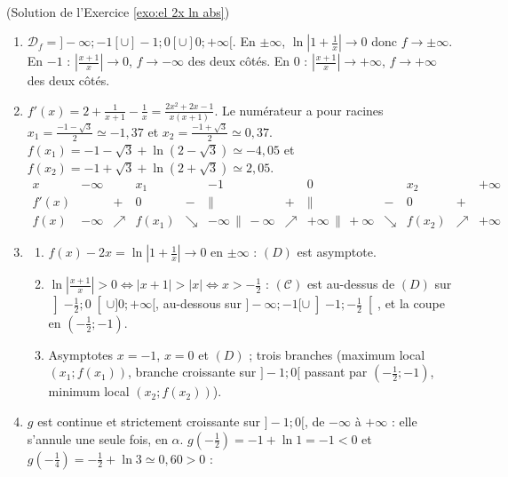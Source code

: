 \begin{corrige}
\begin{sol} ~ \\
(Solution de l'Exercice \ref{exo:el 2x ln abs})
\begin{enumerate}
\item $\mathcal{D}_f = ]-\infty;-1[ \cup ]-1;0[ \cup ]0;+\infty[$. En $\pm\infty$, $\ln\left|1 + \frac{1}{x}\right| \to 0$ donc $f \to \pm\infty$.
      En $-1$ : $\left|\frac{x+1}{x}\right| \to 0$, $f \to -\infty$ des deux c\^ot\'es. En $0$ : $\left|\frac{x+1}{x}\right| \to +\infty$, $f \to +\infty$ des deux c\^ot\'es.
\item $f'(x) = 2 + \frac{1}{x+1} - \frac{1}{x} = \frac{2x^2 + 2x - 1}{x(x+1)}$. Le num\'erateur a pour racines
      $x_1 = \frac{-1-\sqrt{3}}{2} \simeq -1{,}37$ et $x_2 = \frac{-1+\sqrt{3}}{2} \simeq 0{,}37$.
      $f(x_1) = -1 - \sqrt{3} + \ln\left(2 - \sqrt{3}\right) \simeq -4{,}05$ et $f(x_2) = -1 + \sqrt{3} + \ln\left(2 + \sqrt{3}\right) \simeq 2{,}05$.
      \[
      \begin{array}{c|ccccccccccc}
      x & -\infty & & x_1 & & -1 & & 0 & & x_2 & & +\infty \\ \hline
      f'(x) & & + & 0 & - & \| & + & \| & - & 0 & + & \\ \hline
      f(x) & -\infty & \nearrow & f(x_1) & \searrow & -\infty \, \| \, -\infty & \nearrow & +\infty \, \| \, +\infty & \searrow & f(x_2) & \nearrow & +\infty
      \end{array}
      \]
\item \begin{enumerate}
      \item $f(x) - 2x = \ln\left|1 + \frac{1}{x}\right| \to 0$ en $\pm\infty$ : $(D)$ est asymptote.
      \item $\ln\left|\frac{x+1}{x}\right| > 0 \iff |x + 1| > |x| \iff x > -\frac{1}{2}$ : $(\mathcal{C})$ est au-dessus de $(D)$ sur
            $\left]-\frac{1}{2};0\right[ \cup ]0;+\infty[$, au-dessous sur $]-\infty;-1[ \cup \left]-1;-\frac{1}{2}\right[$, et la coupe en $\left(-\frac{1}{2};-1\right)$.
      \item Asymptotes $x = -1$, $x = 0$ et $(D)$ ; trois branches (maximum local $(x_1;f(x_1))$, branche croissante sur $]-1;0[$ passant par $\left(-\frac{1}{2};-1\right)$,
            minimum local $(x_2;f(x_2))$).
      \end{enumerate}
\item $g$ est continue et strictement croissante sur $]-1;0[$, de $-\infty$ \`a $+\infty$ : elle s'annule une seule fois, en $\alpha$.
      $g\left(-\frac{1}{2}\right) = -1 + \ln 1 = -1 < 0$ et $g\left(-\frac{1}{4}\right) = -\frac{1}{2} + \ln 3 \simeq 0{,}60 > 0$ :

\end{enumerate}
\end{sol}
\end{corrige}
